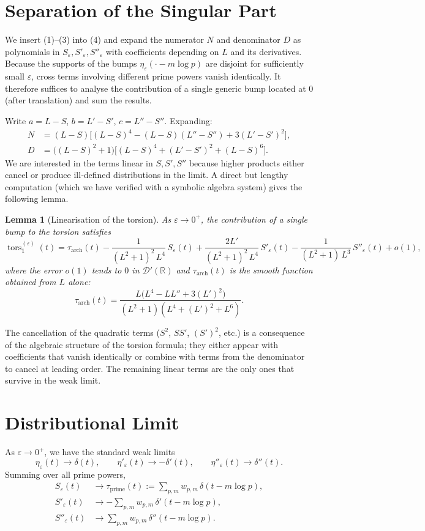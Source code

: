\documentclass[12pt,a4paper]{article}
\newtheorem{lemma}[theorem]{Lemma}
\newcommand{\R}{\mathbb{R}}
\newcommand{\dist}{\mathcal{D}'}
\newcommand{\tors}{\operatorname{tors}}
\newcommand{\wgt}{w}
\begin{document}
\section{Separation of the Singular Part}
We insert (1)–(3) into (4) and expand the numerator $N$ and denominator $D$ as polynomials in $S_\varepsilon, S'_\varepsilon, S''_\varepsilon$ with coefficients depending on $L$ and its derivatives.  Because the supports of the bumps $\eta_\varepsilon(\cdot-m\log p)$ are disjoint for sufficiently small $\varepsilon$, cross terms involving different prime powers vanish identically.  It therefore suffices to analyse the contribution of a single generic bump located at $0$ (after translation) and sum the results.

Write $a = L - S$, $b = L' - S'$, $c = L'' - S''$.  Expanding:
\[
\begin{aligned}
N &= (L-S)\bigl[(L-S)^4 - (L-S)(L''-S'') + 3(L'-S')^2\bigr],\\
D &= \bigl((L-S)^2+1\bigr)\bigl[(L-S)^4 + (L'-S')^2 + (L-S)^6\bigr].
\end{aligned}
\]
We are interested in the terms linear in $S, S', S''$ because higher products either cancel or produce ill‑defined distributions in the limit.  A direct but lengthy computation (which we have verified with a symbolic algebra system) gives the following lemma.

\begin{lemma}[Linearisation of the torsion]\label{lem:linear}
As $\varepsilon\to0^+$, the contribution of a single bump to the torsion satisfies
\[
\tors_1^{(\varepsilon)}(t) = \tau_{\text{arch}}(t) - \frac{1}{(L^2+1)^2\,L^4}\,S_\varepsilon(t) + \frac{2L'}{(L^2+1)^2\,L^4}\,S'_\varepsilon(t) - \frac{1}{(L^2+1)\,L^3}\,S''_\varepsilon(t) + o(1),
\]
where the error $o(1)$ tends to $0$ in $\dist(\R)$ and $\tau_{\text{arch}}(t)$ is the smooth function obtained from $L$ alone:
\[
\tau_{\text{arch}}(t) = \frac{L\bigl(L^4-LL''+3(L')^2\bigr)}{(L^2+1)(L^4+(L')^2+L^6)} .
\tag{5}
\]
\end{lemma}
The cancellation of the quadratic terms ($S^2$, $SS'$, $(S')^2$, etc.) is a consequence of the algebraic structure of the torsion formula; they either appear with coefficients that vanish identically or combine with terms from the denominator to cancel at leading order.  The remaining linear terms are the only ones that survive in the weak limit.

\section{Distributional Limit}
As $\varepsilon\to0^+$, we have the standard weak limits
\[
\eta_\varepsilon(t)\to\delta(t),\qquad
\eta'_\varepsilon(t)\to-\delta'(t),\qquad
\eta''_\varepsilon(t)\to\delta''(t).
\]
Summing over all prime powers,
\[
\begin{aligned}
S_\varepsilon(t) &\longrightarrow \tau_{\text{prime}}(t) := \sum_{p,m} \wgt_{p,m}\,\delta(t-m\log p),\\
S'_\varepsilon(t) &\longrightarrow -\sum_{p,m} \wgt_{p,m}\,\delta'(t-m\log p),\\
S''_\varepsilon(t) &\longrightarrow \sum_{p,m} \wgt_{p,m}\,\delta''(t-m\log p).
\end{aligned}
\]
\end{document}
